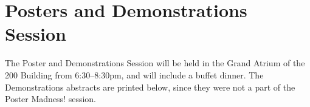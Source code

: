 \clearpage
\section{Posters and Demonstrations Session}

The Poster and Demonstrations Session will be held in the Grand Atrium of the 200 Building from
6:30--8:30pm, and will include a buffet dinner. The Demonstrations abstracts are printed below,
since they were not a part of the Poster Madness! session.

\noindent

